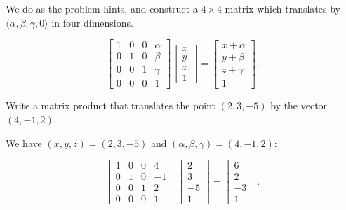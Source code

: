 \documentclass[../key.tex]{subfiles}
\begin{document}
We do as the problem hints, and construct a $4\times 4$ matrix which translates by $\langle \alpha, \beta, \gamma, 0\rangle$ in four dimensions.

$$\begin{bmatrix} 1 & 0 & 0 & \alpha \\ 0 & 1 & 0 & \beta \\ 0 & 0 & 1 & \gamma \\ 0 & 0 & 0 & 1 \end{bmatrix} \begin{bmatrix} x \\ y \\ z \\ 1 \end{bmatrix} = \begin{bmatrix} x + \alpha \\ y + \beta \\ z + \gamma \\ 1\end{bmatrix}.$$

\begin{inner_problem}
\item Write a matrix product that translates the point $(2,3,-5)$ by the vector $(4,-1,2)$.
\end{inner_problem}

We have $(x,y,z)=(2,3,-5)$ and $(\alpha,\beta,\gamma) = (4,-1,2)$:

$$\begin{bmatrix} 1 & 0 & 0 & 4 \\ 0 & 1 & 0 & -1 \\ 0 & 0 & 1 & 2 \\ 0 & 0 & 0 & 1 \end{bmatrix} \begin{bmatrix} 2 \\ 3 \\ -5 \\ 1 \end{bmatrix} = \begin{bmatrix} 6 \\ 2 \\ -3 \\ 1\end{bmatrix}.$$
\end{document}
